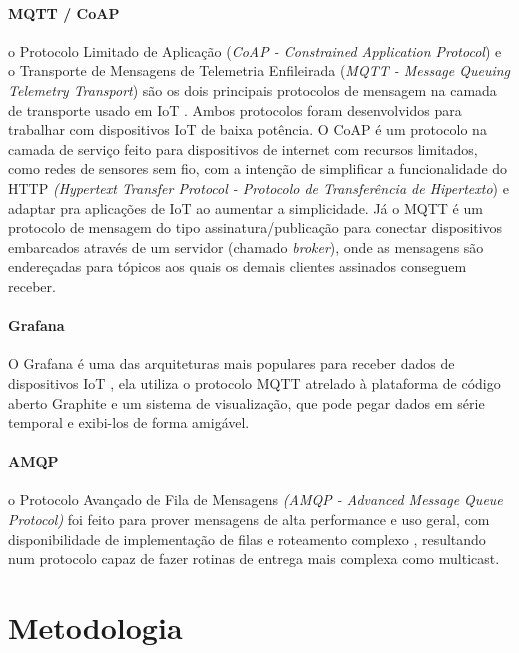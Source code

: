 \documentclass[tcc,capa]{texufpel}
\begin{document}
\subsubsection{MQTT / CoAP}

o Protocolo Limitado de Aplicação (\textit{CoAP - Constrained Application Protocol})  e o Transporte de Mensagens de Telemetria Enfileirada (\textit{MQTT - Message Queuing Telemetry Transport}) são os dois principais protocolos de mensagem na camada de transporte usado em IoT \cite{schiller}. Ambos protocolos foram desenvolvidos para trabalhar com dispositivos IoT de baixa potência. O CoAP é um protocolo na camada de serviço feito para dispositivos de internet com recursos limitados, como redes de sensores sem fio, com a intenção de simplificar a funcionalidade do HTTP \textit{(Hypertext Transfer Protocol - Protocolo de Transferência de Hipertexto}) e adaptar pra aplicações de IoT ao aumentar a simplicidade. Já o MQTT é um protocolo de mensagem do tipo assinatura/publicação para conectar dispositivos embarcados através de um servidor (chamado \textit{broker}), onde as mensagens são endereçadas para tópicos aos quais os demais clientes assinados conseguem receber.

\subsubsection{Grafana}

O Grafana é uma das arquiteturas mais populares para receber dados de dispositivos IoT \cite{schiller}, ela utiliza o protocolo MQTT atrelado à plataforma de código aberto Graphite e um sistema de visualização, que pode pegar dados em série temporal e exibi-los de forma amigável.

\subsubsection{AMQP}

o Protocolo Avançado de Fila de Mensagens \textit{(AMQP - Advanced Message Queue Protocol)} foi feito para prover mensagens de alta performance e uso geral, com disponibilidade de implementação de filas e roteamento complexo \cite{o2007toward}, resultando num protocolo capaz de fazer rotinas de entrega mais complexa como multicast.

\chapter{Metodologia}
\end{document}
